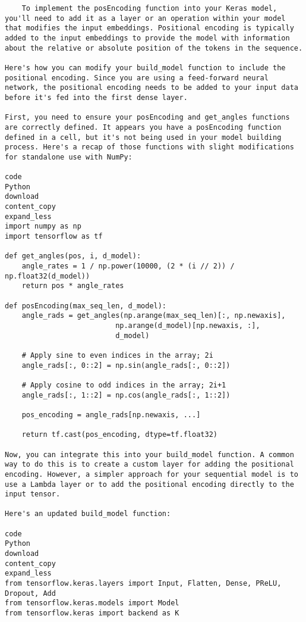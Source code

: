 \documentclass{article}
\begin{document}
\begin{verbatim}
    To implement the posEncoding function into your Keras model, you'll need to add it as a layer or an operation within your model that modifies the input embeddings. Positional encoding is typically added to the input embeddings to provide the model with information about the relative or absolute position of the tokens in the sequence.

Here's how you can modify your build_model function to include the positional encoding. Since you are using a feed-forward neural network, the positional encoding needs to be added to your input data before it's fed into the first dense layer.

First, you need to ensure your posEncoding and get_angles functions are correctly defined. It appears you have a posEncoding function defined in a cell, but it's not being used in your model building process. Here's a recap of those functions with slight modifications for standalone use with NumPy:

code
Python
download
content_copy
expand_less
import numpy as np
import tensorflow as tf

def get_angles(pos, i, d_model):
    angle_rates = 1 / np.power(10000, (2 * (i // 2)) / np.float32(d_model))
    return pos * angle_rates

def posEncoding(max_seq_len, d_model):
    angle_rads = get_angles(np.arange(max_seq_len)[:, np.newaxis],
                          np.arange(d_model)[np.newaxis, :],
                          d_model)

    # Apply sine to even indices in the array; 2i
    angle_rads[:, 0::2] = np.sin(angle_rads[:, 0::2])

    # Apply cosine to odd indices in the array; 2i+1
    angle_rads[:, 1::2] = np.cos(angle_rads[:, 1::2])

    pos_encoding = angle_rads[np.newaxis, ...]

    return tf.cast(pos_encoding, dtype=tf.float32)

Now, you can integrate this into your build_model function. A common way to do this is to create a custom layer for adding the positional encoding. However, a simpler approach for your sequential model is to use a Lambda layer or to add the positional encoding directly to the input tensor.

Here's an updated build_model function:

code
Python
download
content_copy
expand_less
from tensorflow.keras.layers import Input, Flatten, Dense, PReLU, Dropout, Add
from tensorflow.keras.models import Model
from tensorflow.keras import backend as K


\end{verbatim}
\end{document}
